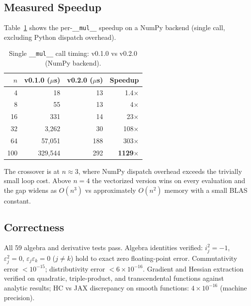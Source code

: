 \documentclass[11pt]{article}
\begin{document}
\subsection{Measured Speedup}

Table~\ref{tab:speedup} shows the per-\texttt{\_\_mul\_\_} speedup on a NumPy
backend (single call, excluding Python dispatch overhead).

\begin{table}[h]
\centering
\caption{Single \texttt{\_\_mul\_\_} call timing: v0.1.0 vs v0.2.0 (NumPy backend).}
\label{tab:speedup}
\begin{tabular}{rrrr}
\toprule
$n$ & v0.1.0 ($\mu$s) & v0.2.0 ($\mu$s) & Speedup \\
\midrule
  4 &       18        &       13        &  1.4$\times$ \\
  8 &       55        &       13        &  4$\times$   \\
 16 &      331        &       14        &  23$\times$  \\
 32 &    3,262        &       30        & 108$\times$  \\
 64 &   57,051        &      188        & 303$\times$  \\
100 &  329,544        &      292        & \textbf{1129$\times$} \\
\bottomrule
\end{tabular}
\end{table}

The crossover is at $n \approx 3$, where NumPy dispatch overhead exceeds the trivially
small loop cost. Above $n = 4$ the vectorized version wins on every evaluation and the
gap widens as $O(n^3)$ vs approximately $O(n^2)$ memory with a small BLAS constant.

\subsection{Correctness}

All 59 algebra and derivative tests pass. Algebra identities verified:
$i_j^2 = -1$, $\varepsilon_j^2 = 0$, $\varepsilon_j\varepsilon_k = 0$ ($j \neq k$)
hold to exact zero floating-point error. Commutativity error $< 10^{-15}$;
distributivity error $< 6 \times 10^{-16}$. Gradient and Hessian extraction verified
on quadratic, triple-product, and transcendental functions against analytic results;
HC vs JAX discrepancy on smooth functions: $4 \times 10^{-16}$ (machine precision).

\end{document}
